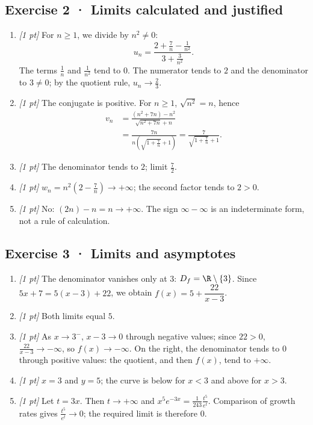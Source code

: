 \subsection*{Exercise 2 · Limits calculated and justified}\begin{enumerate}

\item \textit{[1 pt]} For $n\ge1$, we divide by $n^2\ne0$:
\[u_n=\frac{2+\frac{7}{n}-\frac{1}{n^2}}{3+\frac{3}{n^2}}.\]
The terms $\frac{1}{n}$ and $\frac{1}{n^2}$ tend to $0$. The numerator tends to $2$ and the denominator to $3\ne0$; by the quotient rule, $u_n\to\frac{2}{3}$.

\item \textit{[1 pt]} The conjugate is positive. For $n\ge1$, $\sqrt{n^2}=n$, hence
\[\begin{aligned}v_n&=\frac{(n^2+7n)-n^2}{\sqrt{n^2+7n}+n}\\&=\frac{7n}{n(\sqrt{1+\frac{7}{n}}+1)}=\frac{7}{\sqrt{1+\frac{7}{n}}+1}.\end{aligned}\]

\item \textit{[1 pt]} The denominator tends to $2$; limit $\frac{7}{2}$.

\item \textit{[1 pt]} $w_n=n^2(2-\frac{7}{n})\to+\infty$; the second factor tends to $2>0$.

\item \textit{[1 pt]} No: $(2n)-n=n\to+\infty$. The sign $\infty-\infty$ is an indeterminate form, not a rule of calculation.

\end{enumerate}

\subsection*{Exercise 3 · Limits and asymptotes}\begin{enumerate}

\item \textit{[1 pt]} The denominator vanishes only at $3$: $D_f=\R\setminus\{3\}$. Since $5x+7=5(x-3)+22$, we obtain $f(x)=5+\dfrac{22}{x-3}$.

\item \textit{[1 pt]} Both limits equal $5$.

\item \textit{[1 pt]} As $x\to 3^-$, $x-3\to0$ through negative values; since $22>0$, $\frac{22}{x-3}\to-\infty$, so $f(x)\to-\infty$. On the right, the denominator tends to $0$ through positive values: the quotient, and then $f(x)$, tend to $+\infty$.

\item \textit{[1 pt]} $x=3$ and $y=5$; the curve is below for $x<3$ and above for $x>3$.

\item \textit{[1 pt]} Let $t=3x$. Then $t\to+\infty$ and $x^5e^{-3x}=\frac{1}{243}\frac{t^5}{e^t}$. Comparison of growth rates gives $\frac{t^5}{e^t}\to0$; the required limit is therefore $0$.

\end{enumerate}

